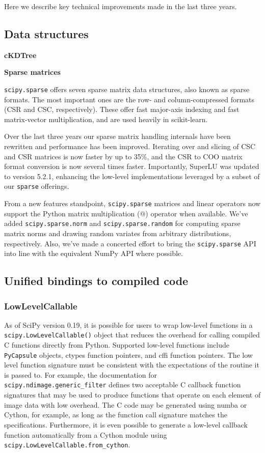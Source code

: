 \documentclass[fleqn,10pt]{wlscirep}
\begin{document}
Here we describe key technical improvements made in the last three years.

\subsection*{Data structures}
\textbf{cKDTree}

\textbf{Sparse matrices}

\texttt{scipy.sparse} offers seven sparse matrix data structures,
also known as sparse formats. The most important ones are the row- 
and column-compressed formats (CSR and CSC, respectively). 
These offer fast major-axis indexing and fast matrix-vector multiplication,
and are used heavily in scikit-learn.

Over the last three years our sparse matrix handling internals have
been rewritten and performance has been improved. Iterating over 
and slicing of CSC and CSR matrices is now faster by up to 35\%,
and the CSR to COO matrix format conversion is now several times faster.
Importantly, SuperLU\cite{superlu_ug99} was updated to version 5.2.1, enhancing
the low-level implementations leveraged by a subset of our \texttt{sparse}
offerings.

From a new features standpoint, \texttt{scipy.sparse} matrices and linear
operators now support the Python matrix multiplication (@) operator when
available. We've added \texttt{scipy.sparse.norm} and \texttt{scipy.sparse.random} 
for computing sparse matrix norms and drawing random variates from arbitrary 
distributions, respectively. Also, we've made a concerted effort to bring the
\texttt{scipy.sparse} API into line with the equivalent NumPy API where possible.

\subsection*{Unified bindings to compiled code}
\subsubsection*{LowLevelCallable}
As of SciPy version 0.19, it is possible for users to wrap low-level
functions in a \texttt{scipy.LowLevelCallable()} object that reduces
the overhead for calling compiled C functions directly from Python.
Supported low-level functions include \texttt{PyCapsule} objects,
ctypes function pointers, and cffi function pointers. The low level
function signature must be consistent with the expectations of the
routine it is passed to. For example, the documentation for
\texttt{scipy.ndimage.generic\_filter} defines two acceptable C callback
function signatures that may be used to produce functions that operate
on each element of image data with low overhead. The C code may be
generated using numba or Cython, for example, as long as the function
call signature matches the specifications. Furthermore, it is even
possible to generate a low-level callback function automatically
from a Cython module using \texttt{scipy.LowLevelCallable.from\_cython}.
\end{document}
